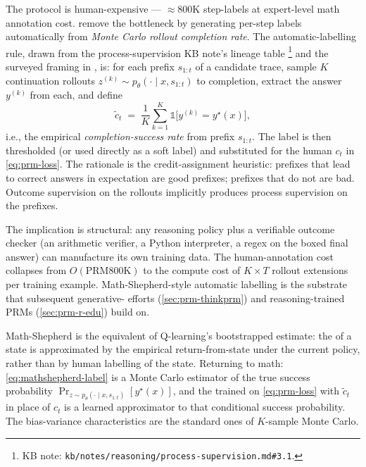 The  protocol is human-expensive --- $\approx 800$K step-labels
at expert-level math annotation cost. \citet{wang2024-mathshepherd}
remove the bottleneck by generating per-step labels automatically from
\emph{Monte Carlo rollout completion rate}. The
automatic-labelling rule, drawn from the
process-supervision KB note's lineage table%
\footnote{KB note: \nolinkurl{kb/notes/reasoning/process-supervision.md#3.1}.}
and the surveyed framing in \citet{zheng2025-prm-survey}, is: for each
prefix $s_{1:t}$ of a candidate trace, sample $K$ continuation rollouts
$z^{(k)} \sim p_\theta(\cdot \mid x, s_{1:t})$ to completion, extract
the answer $y^{(k)}$ from each, and define
\begin{equation}
  \tilde c_t \;=\; \frac{1}{K} \sum_{k=1}^{K} \mathbb{1}\!\bigl[y^{(k)} = y^\star(x)\bigr],
  \label{eq:mathshepherd-label}
\end{equation}
i.e., the empirical \emph{completion-success rate} from prefix
$s_{1:t}$. The label is then thresholded (or used directly as a soft
label) and substituted for the human $c_t$ in \cref{eq:prm-loss}. The
rationale is the credit-assignment heuristic: prefixes that lead to
correct answers in expectation are good prefixes; prefixes that do
not are bad. Outcome supervision on the rollouts implicitly produces
process supervision on the prefixes.

The implication is structural: any reasoning policy plus a verifiable
outcome checker (an arithmetic verifier, a Python interpreter, a
regex on the boxed final answer) can manufacture its own  training
data. The human-annotation cost collapses from $O(\text{PRM800K})$
to the compute cost of $K \times T$ rollout extensions per training
example. Math-Shepherd-style automatic labelling is the substrate
that subsequent generative- efforts (\cref{sec:prm-thinkprm}) and
reasoning-trained PRMs (\cref{sec:prm-r-edu}) build on.

\begin{analogy}
Math-Shepherd is the  equivalent of Q-learning's bootstrapped
 estimate: the  of a state is approximated by the
empirical return-from-state under the current policy, rather than by
human labelling of the state. Returning to math: \cref{eq:mathshepherd-label}
is a Monte Carlo estimator of the true success probability
$\Pr_{z \sim p_\theta(\cdot \mid x, s_{1:t})}[y^\star(x)]$, and the
 trained on \cref{eq:prm-loss} with $\tilde c_t$ in place of $c_t$
is a learned approximator to that conditional success probability.
The bias-variance characteristics are the standard ones of $K$-sample
Monte Carlo.
\end{analogy}

